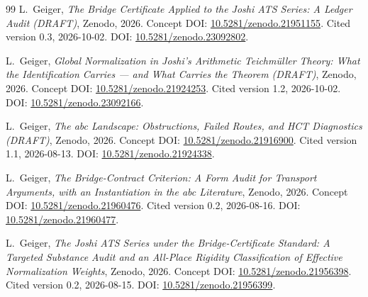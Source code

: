 \documentclass[11pt,a4paper]{article}
\theoremstyle{definition}
\theoremstyle{remark}
\begin{document}
\begin{thebibliography}{99}
L.~Geiger,
\emph{The Bridge Certificate Applied to the Joshi ATS Series: A Ledger Audit (DRAFT)},
Zenodo, 2026.
Concept DOI: \href{https://doi.org/10.5281/zenodo.21951155}{10.5281/zenodo.21951155}.
Cited version 0.3, 2026-10-02.
DOI: \href{https://doi.org/10.5281/zenodo.23092802}{10.5281/zenodo.23092802}.

L.~Geiger,
\emph{Global Normalization in Joshi's Arithmetic Teichmüller Theory: What the Identification Carries --- and What Carries the Theorem (DRAFT)},
Zenodo, 2026.
Concept DOI: \href{https://doi.org/10.5281/zenodo.21924253}{10.5281/zenodo.21924253}.
Cited version 1.2, 2026-10-02.
DOI: \href{https://doi.org/10.5281/zenodo.23092166}{10.5281/zenodo.23092166}.

L.~Geiger,
\emph{The abc Landscape: Obstructions, Failed Routes, and HCT Diagnostics (DRAFT)},
Zenodo, 2026.
Concept DOI: \href{https://doi.org/10.5281/zenodo.21916900}{10.5281/zenodo.21916900}.
Cited version 1.1, 2026-08-13.
DOI: \href{https://doi.org/10.5281/zenodo.21924338}{10.5281/zenodo.21924338}.

L.~Geiger,
\emph{The Bridge-Contract Criterion: A Form Audit for Transport Arguments, with an Instantiation in the abc Literature},
Zenodo, 2026.
Concept DOI: \href{https://doi.org/10.5281/zenodo.21960476}{10.5281/zenodo.21960476}.
Cited version 0.2, 2026-08-16.
DOI: \href{https://doi.org/10.5281/zenodo.21960477}{10.5281/zenodo.21960477}.

L.~Geiger,
\emph{The Joshi ATS Series under the Bridge-Certificate Standard: A Targeted Substance Audit and an All-Place Rigidity Classification of Effective Normalization Weights},
Zenodo, 2026.
Concept DOI: \href{https://doi.org/10.5281/zenodo.21956398}{10.5281/zenodo.21956398}.
Cited version 0.2, 2026-08-15.
DOI: \href{https://doi.org/10.5281/zenodo.21956399}{10.5281/zenodo.21956399}.

\end{thebibliography}
\end{document}

